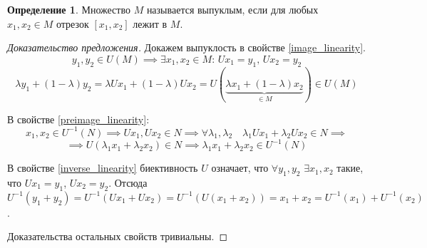 \documentclass[11pt,openany,a4paper]{scrartcl}
\theoremstyle{plain}
\theoremstyle{definition}
\newtheorem{definition}[theorem]{Определение}
\begin{document}
\begin{definition}
    Множество $M$ называется выпуклым, если для любых $x_1,x_2 \in M$ отрезок
    $[x_1, x_2]$ лежит в $M$.
\end{definition}
\begin{proof}[Доказательство предложения]
    Докажем выпуклость в свойстве \ref{image_linearity}.
    $$
    y_1, y_2 \in U(M) \implies \exists x_1, x_2 \in M:\, Ux_1 = y_1,\,
    Ux_2 = y_2
    $$
    $$
    \lambda y_1 + (1-\lambda)y_2 = \lambda Ux_1 + (1 - \lambda)Ux_2 =
    U(\underbrace{\lambda x_1 + (1-\lambda)x_2}_{\in M}) \in U(M)
    $$
    
    В свойстве \ref{preimage_linearity}:
    $$
    x_1, x_2 \in U^{-1}(N) \implies Ux_1, Ux_2 \in N \implies
    \forall \lambda_1, \lambda_2\quad \lambda_1 Ux_1 + \lambda_2 Ux_2 \in N
    \implies
    $$
    $$
    \implies U(\lambda_1 x_1 + \lambda_2 x_2) \in N \implies
    \lambda_1x_1 + \lambda_2x_2 \in U^{-1}(N)
    $$
    
    В свойстве \ref{inverse_linearity} биективность $U$ означает, что
    $\forall y_1, y_2$ $\exists x_1, x_2$ такие, что $Ux_1 = y_1$,
    $Ux_2 = y_2$. Отсюда $U^{-1}(y_1+y_2) = U^{-1}(Ux_1 + Ux_2) =
    U^{-1}(U(x_1 + x_2)) = x_1 + x_2 = U^{-1}(x_1) + U^{-1}(x_2)$.
    
    Доказательства остальных свойств тривиальны.
\end{proof}
\end{document}
